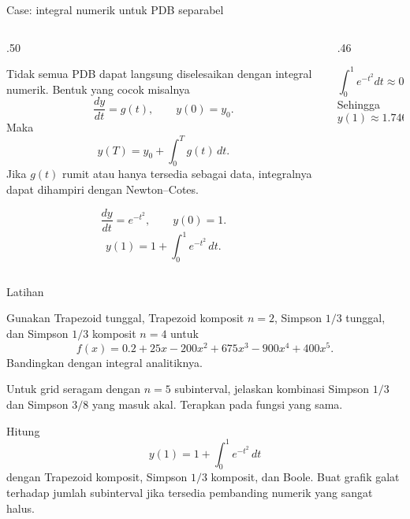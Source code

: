 \documentclass[aspectratio=169,10pt]{beamer}
\begin{document}
\begin{frame}{Case: integral numerik untuk PDB separabel}
\scriptsize
\begin{columns}[T,totalwidth=\textwidth]
\begin{column}{.50\textwidth}
\begin{bluebox}
Tidak semua PDB dapat langsung diselesaikan dengan integral numerik. Bentuk yang cocok misalnya
\[
\frac{dy}{dt}=g(t),\qquad y(0)=y_0.
\]
Maka
\[
y(T)=y_0+\int_0^T g(t)\,dt.
\]
Jika $g(t)$ rumit atau hanya tersedia sebagai data, integralnya dapat dihampiri dengan Newton--Cotes.
\end{bluebox}
\begin{orangebox}[Contoh]
\[
\frac{dy}{dt}=e^{-t^2},\qquad y(0)=1.
\]
\[
y(1)=1+\int_0^1 e^{-t^2}\,dt.
\]
\end{orangebox}
\end{column}
\begin{column}{.46\textwidth}
\begin{greenbox}[Dengan Simpson 1/3 n=4]
\[
\int_0^1 e^{-t^2}dt\approx0.746855.
\]
Sehingga
\[
y(1)\approx1.746855.
\]
\end{greenbox}
\end{column}
\end{columns}
\end{frame}

\begin{frame}{Latihan}
\scriptsize
\begin{orangebox}[1. Dasar]
Gunakan Trapezoid tunggal, Trapezoid komposit $n=2$, Simpson $1/3$ tunggal, dan Simpson $1/3$ komposit $n=4$ untuk
\[
f(x)=0.2+25x-200x^2+675x^3-900x^4+400x^5.
\]
Bandingkan dengan integral analitiknya.
\end{orangebox}
\begin{greenbox}
Untuk grid seragam dengan $n=5$ subinterval, jelaskan kombinasi Simpson $1/3$ dan Simpson $3/8$ yang masuk akal. Terapkan pada fungsi yang sama.
\end{greenbox}
\begin{purplebox}
Hitung
\[
y(1)=1+\int_0^1 e^{-t^2}\,dt
\]
dengan Trapezoid komposit, Simpson $1/3$ komposit, dan Boole. Buat grafik galat terhadap jumlah subinterval jika tersedia pembanding numerik yang sangat halus.
\end{purplebox}
\end{frame}
\end{document}
